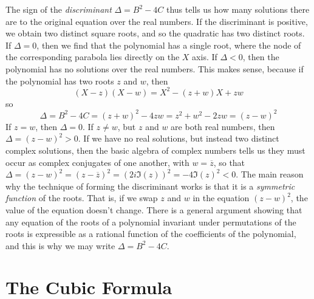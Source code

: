 The sign of the {\it discriminant} $\Delta = B^2 - 4C$ thus tells us how many solutions there are to the original equation over the real numbers. If the discriminant is positive, we obtain two distinct square roots, and so the quadratic has two distinct roots. If $\Delta = 0$, then we find that the polynomial has a single root, where the node of the corresponding parabola lies directly on the $X$ axis. If $\Delta < 0$, then the polynomial has no solutions over the real numbers. This makes sense, because if the polynomial has two roots $z$ and $w$, then
%
\[ (X - z)(X - w) = X^2 - (z + w)X + zw \]
%
so
%
\[ \Delta = B^2 - 4C = (z + w)^2 - 4zw = z^2 + w^2 - 2zw = (z - w)^2 \]
%
If $z = w$, then $\Delta = 0$. If $z \neq w$, but $z$ and $w$ are both real numbers, then $\Delta = (z - w)^2 > 0$. If we have no real solutions, but instead two distinct complex solutions, then the basic algebra of complex numbers tells us they must occur as complex conjugates of one another, with $w = \overline{z}$, so that $\Delta = (z - w)^2 = (z - \overline{z})^2 = (2 i \Im(z))^2 = -4 \Im(z)^2 < 0$. The main reason why the technique of forming the discriminant works is that it is a {\it symmetric function} of the roots. That is, if we swap $z$ and $w$ in the equation $(z - w)^2$, the value of the equation doesn't change. There is a general argument showing that any equation of the roots of a polynomial invariant under permutations of the roots is expressible as a rational function of the coefficients of the polynomial, and this is why we may write $\Delta = B^2 - 4C$.

\section{The Cubic Formula}

